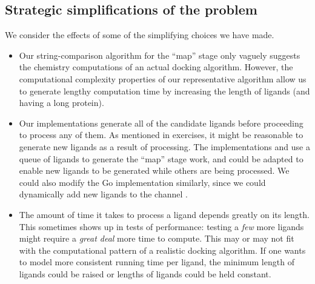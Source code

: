 \documentclass[letterpaper,10pt,openany,oneside]{sphinxmanual}
\begin{document}
\subsection{Strategic simplifications of the problem}
\label{evaluation/evaluation:strategic-simplifications-of-the-problem}
We consider the effects of some of the simplifying choices we have made.
\begin{itemize}
\item {} 
Our string-comparison algorithm for the “map” stage only vaguely suggests the chemistry computations of an actual docking algorithm.  However, the computational complexity properties of our representative algorithm allow us to generate lengthy computation time by increasing the length of ligands (and having a long protein).

\item {} 
Our implementations generate all of the candidate ligands before proceeding to process any of them. As mentioned in exercises, it might be reasonable to generate new ligands as a result of processing. The implementations  and  use a queue of ligands to generate the “map” stage work, and could be adapted to enable new ligands to be generated while others are being processed. We could also modify the Go implementation  similarly, since we could dynamically add new ligands to the channel .

\item {} 
The amount of time it takes to process a ligand depends greatly on its length. This sometimes shows up in tests of performance: testing a \emph{few} more ligands might require a \emph{great deal} more time to compute. This may or may not fit with the computational pattern of a realistic docking algorithm. If one wants to model more consistent running time per ligand, the minimum length of ligands could be raised or lengths of ligands could be held constant.

\end{itemize}
\end{document}
